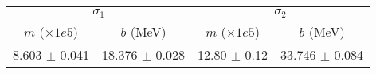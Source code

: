 \begin{tabular}{cc|cc}
\multicolumn{2}{c|}{$\sigma_1$} & \multicolumn{2}{|c}{$\sigma_2$} \\
$m$ ($\times1e5$) & $b$ (MeV) & $m$ ($\times1e5$) & $b$ (MeV) \\
\hline
8.603 $\pm$ 0.041 & 18.376 $\pm$ 0.028 & 12.80 $\pm$ 0.12 & 33.746 $\pm$ 0.084\\
\end{tabular}

